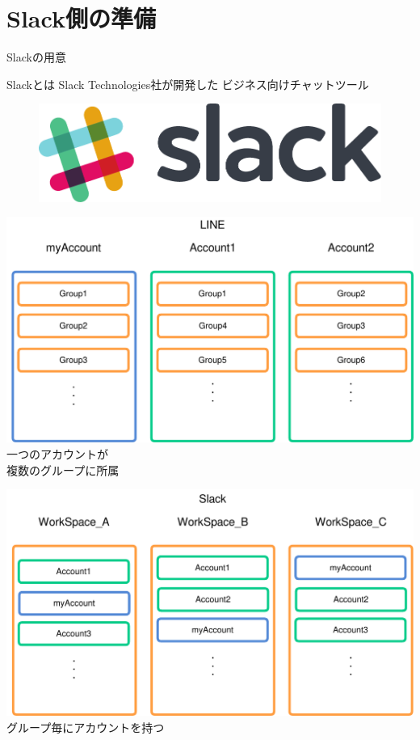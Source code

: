 \documentclass[dvipdfmx,xcolor={svgnames}]{beamer}
\begin{document}
  \section{Slack側の準備}
  \begin{frame}{Slackの用意}
    \begin{block}{Slackとは}
      Slack Technologies社が開発した
      ビジネス向けチャットツール
    \end{block}
    \begin{figure}\centering
      \includegraphics[width=\hsize]{slack_cmyk.pdf}
    \end{figure}
  \end{frame}
  \begin{frame}
    \includegraphics[width=\hsize]{LINE_image_figure.pdf}
    \pause\huge 一つのアカウントが \\ 複数のグループに所属
  \end{frame}
  \begin{frame}
    \includegraphics[width=\hsize]{Slack_image_figure.pdf}
    \pause\huge グループ毎にアカウントを持つ
  \end{frame}
\end{document}
